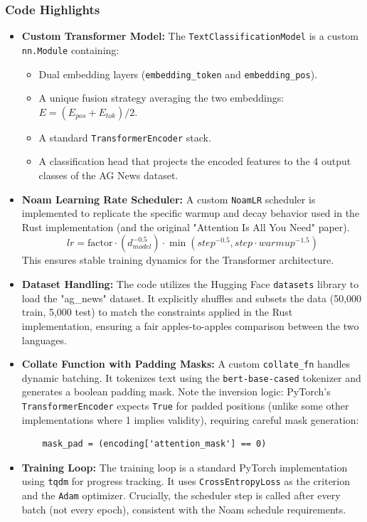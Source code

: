 \documentclass{ieeeaccess}
\begin{document}
\subsubsection{Code Highlights}
\begin{itemize}
    \item \textbf{Custom Transformer Model:}
    The \texttt{TextClassificationModel} is a custom \texttt{nn.Module} containing:
    \begin{itemize}
        \item Dual embedding layers (\texttt{embedding\_token} and \texttt{embedding\_pos}).
        \item A unique fusion strategy averaging the two embeddings: $E = (E_{pos} + E_{tok}) / 2$.
        \item A standard \texttt{TransformerEncoder} stack.
        \item A classification head that projects the encoded features to the 4 output classes of the AG News dataset.
    \end{itemize}
    \item \textbf{Noam Learning Rate Scheduler:}
    A custom \texttt{NoamLR} scheduler is implemented to replicate the specific warmup and decay behavior used in the Rust implementation (and the original "Attention Is All You Need" paper).
    \[
    lr = \text{factor} \cdot (d_{model}^{-0.5}) \cdot \min(step^{-0.5}, step \cdot warmup^{-1.5})
    \]
    This ensures stable training dynamics for the Transformer architecture.
    \item \textbf{Dataset Handling:}
    The code utilizes the Hugging Face \texttt{datasets} library to load the "ag\_news" dataset. It explicitly shuffles and subsets the data (50,000 train, 5,000 test) to match the constraints applied in the Rust implementation, ensuring a fair apples-to-apples comparison between the two languages.
    \item \textbf{Collate Function with Padding Masks:}
    A custom \texttt{collate\_fn} handles dynamic batching. It tokenizes text using the \texttt{bert-base-cased} tokenizer and generates a boolean padding mask. Note the inversion logic: PyTorch's \texttt{TransformerEncoder} expects \texttt{True} for padded positions (unlike some other implementations where 1 implies validity), requiring careful mask generation:
    \begin{lstlisting}
    mask_pad = (encoding['attention_mask'] == 0)
    \end{lstlisting}
    \item \textbf{Training Loop:}
    The training loop is a standard PyTorch implementation using \texttt{tqdm} for progress tracking. It uses \texttt{CrossEntropyLoss} as the criterion and the \texttt{Adam} optimizer. Crucially, the scheduler step is called after every batch (not every epoch), consistent with the Noam schedule requirements.
\end{itemize}
\end{document}
